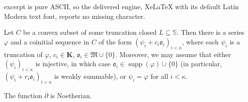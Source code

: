 \documentclass[10pt,a4paper]{amsart}
\newcommand{\tmop}[1]{\ensuremath{\operatorname{#1}}}
\begin{document}
excerpt is pure ASCII, so the delivered engine, XeLaTeX with its default Latin Modern text font, reports no missing character.
\begin{lemma}
  \label{lem:coinitial-sequence}Let $C$ be a convex subset of some truncation
  closed $L \subseteq \mathbb{S}$. Then there is a series $\varphi$ and a
  coinitial sequence in $C$ of the form $(\psi_i + c_i \mathfrak{o}_i)_{i <
  \kappa}$, where each $\psi_i$ is a truncation of $\varphi$, $c_i \in
  \mathbf{K}$, $\mathfrak{o}_i \in \mathfrak{M} \cup \{ 0 \}$. Moreover, we
  may assume that either $(\psi_i)_{i < \kappa}$ is injective, in which case
  $\mathfrak{o}_i \in \tmop{supp} (\varphi) \cup \{ 0 \}$ (in particular,
  $(\psi_i + r_i \mathfrak{o}_i)_{i < \kappa}$ is weakly summable), or $\psi_i
  = \varphi$ for all $i < \kappa$.
\end{lemma}

\begin{proposition}
  \label{prop-Noeth-ext-der}The function $\overline{\partial}$ is Noetherian.
\end{proposition}
\end{document}
